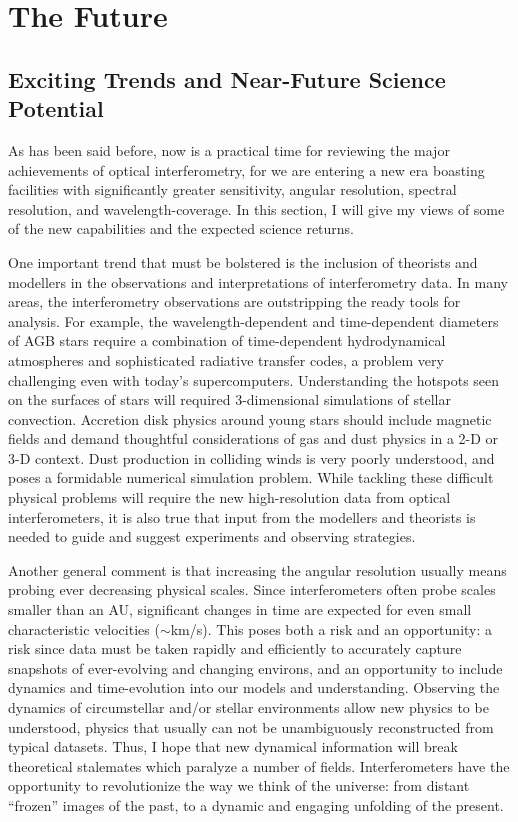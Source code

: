 \documentclass[12pt]{article}
\begin{document}
\section{The Future}
\label{future}
\subsection{Exciting Trends and Near-Future Science Potential}
As has been said before, now is a practical time for reviewing the
major achievements of optical interferometry, for we are entering a
new era boasting facilities with significantly greater
sensitivity, angular resolution, spectral resolution, and
wavelength-coverage.  In this section, I will give my views of some of
the new capabilities and the expected science returns.

One important trend that must be bolstered is the inclusion of
theorists and modellers in the observations and interpretations of
interferometry data.  In many areas, the interferometry observations
are outstripping the ready tools for analysis.  For example, the
wavelength-dependent and time-dependent diameters of AGB stars require
a combination of time-dependent hydrodynamical atmospheres and
sophisticated radiative transfer codes, a problem very challenging
even with today's supercomputers.  Understanding the hotspots seen on
the surfaces of stars will required 3-dimensional simulations of
stellar convection.  Accretion disk physics around young stars should
include magnetic fields and demand thoughtful considerations of gas and dust
physics in a 2-D or 3-D context.  Dust production in colliding winds
is very poorly understood, and poses a formidable numerical simulation
problem.  While tackling these difficult physical problems will
require the new high-resolution data from optical interferometers, it
is also true that input from the modellers and theorists is needed to
guide and suggest experiments and observing strategies.

Another general comment is that increasing the angular resolution
usually means probing ever decreasing physical scales.  Since
interferometers often probe scales smaller than an AU, significant
changes in time are expected for even small characteristic velocities
($\sim$km/s).  This poses both a risk and an opportunity: a risk since
data must be taken rapidly and efficiently to accurately capture
snapshots of ever-evolving and changing environs, and an opportunity
to include dynamics and time-evolution into our models and
understanding.  Observing the dynamics of circumstellar and/or stellar
environments allow new physics to be understood, physics that usually
can not be unambiguously reconstructed from typical datasets. Thus, I
hope that new dynamical information will break theoretical stalemates
which paralyze a number of fields.  Interferometers have the
opportunity to revolutionize the way we think of the universe: from
distant ``frozen'' images of the past, to a dynamic and engaging
unfolding of the present.
\end{document}

